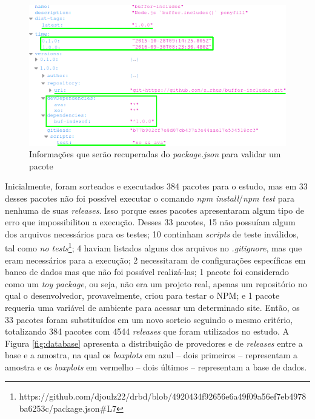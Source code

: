 \begin{figure}
    \centering
    \includegraphics[scale=0.7]{figuras/package_json.png}
    \caption{Informações que serão recuperadas do \textit{package.json} para validar um pacote}
    \label{fig:package_json}
\end{figure}{}

Inicialmente, foram sorteados e executados 384 pacotes para o estudo, mas em 33 desses pacotes não foi possível executar o comando \textit{npm install}/\textit{npm test} para nenhuma de suas \textit{releases}. Isso porque esses pacotes apresentaram algum tipo de erro que impossibilitou a execução. Desses 33 pacotes, 15 não possuíam algum dos arquivos necessários para os testes; 10 continham \textit{scripts} de teste inválidos, tal como \textit{no tests}\footnote{https://github.com/djoulz22/drbd/blob/4920434f92656e6a49f09a56ef7eb4978ba6253c/package.json\#L7}; 4 haviam listados alguns dos arquivos no \textit{.gitignore}, mas que eram necessários para a execução; 2 necessitaram de configurações específicas em banco de dados mas que não foi possível realizá-las; 1 pacote foi considerado como um \textit{toy package}, ou seja, não era um projeto real, apenas um repositório no qual o desenvolvedor, provavelmente, criou para testar o \gls{NPM}; e 1 pacote requeria uma variável de ambiente para acessar um determinado site. Então, os 33 pacotes foram substituídos em um novo sorteio seguindo o mesmo critério, totalizando 384 pacotes com 4544 \textit{releases} que foram utilizados no estudo. A Figura \ref{fig:database} apresenta a distribuição de provedores e de \textit{releases} entre a base e a amostra, na qual os \textit{boxplots} em azul -- dois primeiros -- representam a amostra e os \textit{boxplots} em vermelho -- dois últimos -- representam a base de dados.

